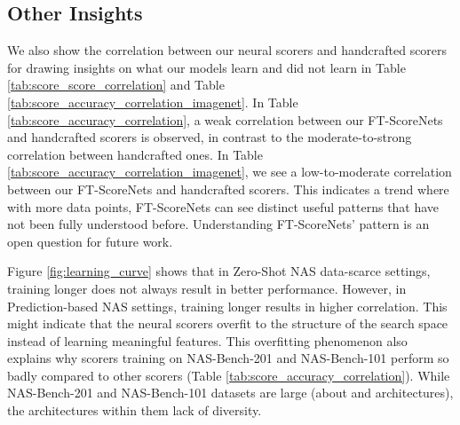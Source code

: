 \documentclass[lettersize,journal]{IEEEtran}
\begin{document}
    \subsection{Other Insights}
        We also show the correlation between our neural scorers and handcrafted scorers for drawing insights on what our models learn and did not learn in Table \ref{tab:score_score_correlation} and Table \ref{tab:score_accuracy_correlation_imagenet}. In Table \ref{tab:score_accuracy_correlation}, a weak correlation between our FT-ScoreNets and handcrafted scorers is observed, in contrast to the moderate-to-strong correlation between handcrafted ones. In Table \ref{tab:score_accuracy_correlation_imagenet}, we see a low-to-moderate correlation between our FT-ScoreNets and handcrafted scorers. This indicates a trend where with more data points, FT-ScoreNets can see distinct useful patterns that have not been fully understood before. Understanding FT-ScoreNets' pattern is an open question for future work.

        Figure \ref{fig:learning_curve} shows that in Zero-Shot NAS data-scarce settings, training longer does not always result in better performance. However, in Prediction-based NAS settings, training longer results in higher correlation. This might indicate that the neural scorers overfit to the structure of the search space instead of learning meaningful features. This overfitting phenomenon also explains why scorers training on NAS-Bench-201 and NAS-Bench-101 perform so badly compared to other scorers (Table \ref{tab:score_accuracy_correlation}). While NAS-Bench-201 and NAS-Bench-101 datasets are large (about  and  architectures), the architectures within them lack of diversity.
    
\end{document}
